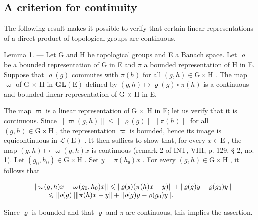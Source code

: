\subsection{A criterion for continuity}

The following result makes it possible to verify that certain linear representations of a direct product of topological groups are continuous.

Lemma 1. --- Let G and H be topological groups and E a Banach space. Let \(\varrho\) be a bounded representation of G in E and \(\pi\) a bounded representation of H in E. Suppose that \(\varrho(g)\) commutes with \(\pi(h)\) for all \((g,h)\in\mathrm{G}\times\mathrm{H}\) . The map \(\varpi\) of G \(\times\) H in \(\mathbf{GL}(\mathrm{E})\) defined by \((g,h)\mapsto\varrho(g)\circ\pi(h)\) is a continuous and bounded linear representation of G \(\times\) H in E.

The map \(\varpi\) is a linear representation of G × H in E; let us verify that it is continuous. Since \(\| \varpi(g, h) \| \leqslant \| \varrho(g) \| \| \pi(h) \|\) for all \((g, h) \in \mathrm{G} \times \mathrm{H}\) , the representation \(\varpi\) is bounded, hence its image is equicontinuous in \(\mathcal{L}(\mathrm{E})\) . It then suffices to show that, for every \(x \in \mathrm{E}\) , the map \((g, h) \mapsto \varpi(g, h)x\) is continuous (remark 2 of INT, VIII, p. 129, § 2, no. 1). Let \((g_0, h_0) \in \mathrm{G} \times \mathrm{H}\) . Set \(y = \pi(h_0)x\) . For every \((g, h) \in \mathrm{G} \times \mathrm{H}\) , it follows that

\[
\begin{array}{r l} & {\| \varpi (g, h) x - \varpi (g _ {0}, h _ {0}) x \| \leqslant \| \varrho (g) (\pi (h) x - y) \| + \| \varrho (g) y - \varrho (g _ {0}) y \|} \\ & {\qquad \leqslant \| \varrho (g) \| \| \pi (h) x - y \| + \| \varrho (g) y - \varrho (g _ {0}) y \|.} \end{array}
\]

Since \(\varrho\) is bounded and that \(\varrho\) and \(\pi\) are continuous, this implies the assertion.
\relax{}
